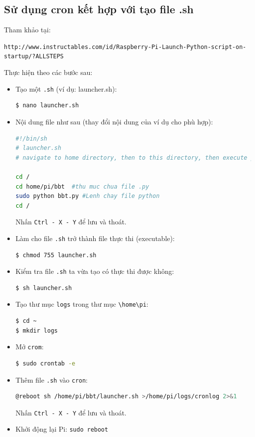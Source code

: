 \subsection{Sử dụng cron kết hợp với tạo file .sh}
Tham khảo tại:

\begin{footnotesize}
\verb|http://www.instructables.com/id/Raspberry-Pi-Launch-Python-script-on-startup/?ALLSTEPS|
\end{footnotesize}

Thực hiện theo các bước sau:
\begin{itemize}
\item Tạo một \verb|.sh| (ví dụ: launcher.sh):
\begin{lstlisting}[language=bash]
$ nano launcher.sh
\end{lstlisting}
\item Nội dung file như sau (thay đổi nội dung của ví dụ cho phù hợp):
\begin{lstlisting}[language=bash]
#!/bin/sh
# launcher.sh
# navigate to home directory, then to this directory, then execute python script, then back home

cd /
cd home/pi/bbt  #thu muc chua file .py
sudo python bbt.py #Lenh chay file python
cd /
\end{lstlisting}
Nhấn \verb|Ctrl - X - Y| để lưu và thoát.
\item Làm cho file \verb|.sh| trở thành file thực thi (executable): 
\begin{lstlisting}[language=bash]
$ chmod 755 launcher.sh
\end{lstlisting}
\item Kiểm tra file \verb|.sh| ta vừa tạo có thực thi được không:
\begin{lstlisting}[language=bash]
$ sh launcher.sh
\end{lstlisting}
\item Tạo thư mục \verb|logs| trong thư mục \verb|\home\pi|:
\begin{lstlisting}[language=bash]
$ cd ~
$ mkdir logs
\end{lstlisting}
\item Mở \verb|crom|:
\begin{lstlisting}[language=bash]
$ sudo crontab -e
\end{lstlisting}
\item Thêm file \verb|.sh| vào \verb|cron|:
\begin{lstlisting}[language=bash]
@reboot sh /home/pi/bbt/launcher.sh >/home/pi/logs/cronlog 2>&1
\end{lstlisting}
Nhấn \verb|Ctrl - X - Y| để lưu và thoát.
\item Khởi động lại Pi: \verb|sudo reboot|
\end{itemize}